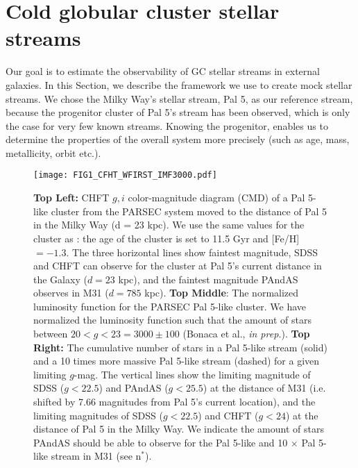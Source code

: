 \documentclass[twocolumn]{aastex62}
\newcommand{\msun}{\textrm{M}_\odot}
\begin{document}
\section{Cold globular cluster stellar streams}
\label{sec:coldstreams}
Our goal is to estimate the observability of GC stellar streams in external galaxies. In this Section, we describe the framework we use to create mock stellar streams.  We chose the Milky Way's stellar stream, Pal 5,  as our reference stream, because the progenitor cluster of Pal 5's stream has been observed, which is only the case for very few known streams. Knowing the progenitor, enables us to determine the properties of the overall system more precisely (such as age, mass, metallicity, orbit etc.). 


\begin{figure*}
\centerline{\texttt{[image: FIG1\_CFHT\_WFIRST\_IMF3000.pdf]}}
\caption{%
{\bf Top Left:} CHFT $g, i$ color-magnitude diagram (CMD) of a Pal 5-like cluster from the PARSEC system moved to the distance of Pal 5 in the Milky Way (d = 23 kpc). We use the same values for the cluster as \citet{ibata17}: the age of the cluster is set to 11.5 Gyr and [Fe/H] $= -1.3$. The three horizontal lines show faintest magnitude, SDSS and CHFT can observe for the cluster at Pal 5's current distance in the Galaxy ($d = 23$ kpc), and the faintest magnitude PAndAS observes in M31 ($d = 785$ kpc). {\bf Top Middle}: The normalized luminosity function for the PARSEC Pal 5-like cluster. We have normalized the luminosity function such that the amount of stars between $20 < g < 23 = 3000 \pm 100$ (Bonaca et al., {\it in prep.}). %
{\bf Top Right:} The cumulative number of stars in a Pal 5-like stream (solid) and a 10 times more massive Pal 5-like stream (dashed) for a given limiting $g$-mag. The vertical lines show the limiting magnitude of SDSS ($g < 22.5$) and PAndAS ($g < 25.5$) at the distance of M31 (i.e. shifted by 7.66 magnitudes from Pal 5's current location), and the limiting magnitudes of SDSS ($g < 22.5$) and CHFT ($g < 24$) at the distance of Pal 5 in the Milky Way. We indicate the amount of stars PAndAS should be able to observe for the Pal 5-like and 10 $\times$  Pal 5-like stream in M31 (see n$^*$). 
}
\end{figure*}
\end{document}
